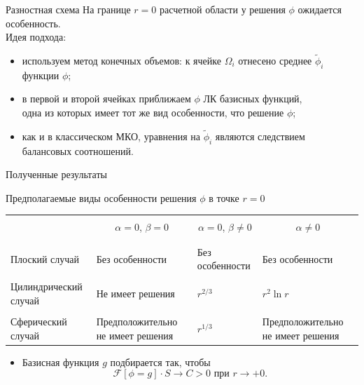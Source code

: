 \begin{frame}{Разностная схема}
\parind На границе $r = 0$ расчетной области у решения $\phi$ ожидается особенность. \\[3mm]
\parind Идея подхода:
\begin{itemize}
    \item используем метод конечных объемов: к ячейке $\Omega_i$ отнесено среднее $\widetilde{\phi}_i$ функции $\phi$;
    \item в первой и второй ячейках приближаем $\phi$ ЛК базисных функций, \\ одна из которых имеет тот же вид особенности, что решение $\phi$;
    \item как и в классическом МКО, уравнения на $\widetilde{\phi}_i$ являются следствием \\ балансовых соотношений.
\end{itemize}
\end{frame}


\begin{frame}{Полученные результаты}
\vspace{-3mm}
\begin{center}
    Предполагаемые виды особенности решения $\phi$ в точке $r = 0$
\end{center}
\vspace{-1mm}
\begin{tabular}{|m{3cm}||m{3.5cm}|m{3.5cm}|m{3.5cm}|}
    \hline
    &&& \\[-3mm]
    &
    \multicolumn{1}{c}{$\alpha = 0$, $\beta = 0$} &
    \multicolumn{1}{c}{$\alpha = 0$, $\beta \neq 0$} &
    \multicolumn{1}{c}{$\alpha \neq 0$} \\[-2mm]
    &&& \\[-1.5mm]
    \hline
    \hline
    &&& \\[-3.5mm]
    Плоский \linebreak случай & \textcolor{dark_green}{Без особенности} & \textcolor{dark_green}{Без особенности} & \textcolor{dark_green}{Без особенности} \\[3.5mm]
    \hline
    &&& \\[-3.5mm]
    Цилиндрический \linebreak случай & \textcolor{dark_red}{Не имеет решения} & $r^{2/3}$ & $r^2 \ln r$ \\[3.5mm]
    \hline
    &&& \\[-3.5mm]
    Сферический \linebreak случай & \textcolor{dark_red}{Предположительно не имеет решения} & $r^{1/3}$ & \textcolor{dark_red}{Предположительно не имеет решения} \\[3.5mm]
    \hline
\end{tabular}
\begin{itemize}
    \item Базисная функция $g$ подбирается так, чтобы
    \vspace{-0.2cm}
    $$\mathcal{F}[\phi = g] \cdot S \to C > 0 \text{ при } r \to +0.$$
\end{itemize}
\end{frame}


